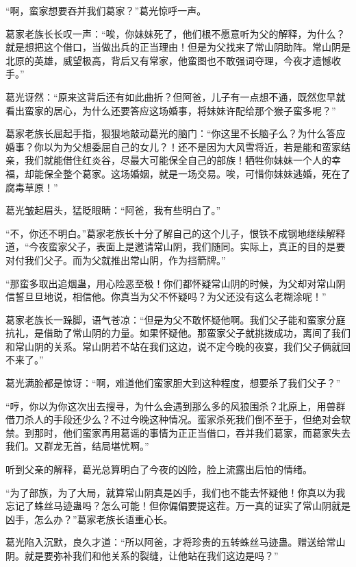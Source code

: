 
\begin{this_body}

“啊，蛮家想要吞并我们葛家？”葛光惊呼一声。

葛家老族长长叹一声：“唉，你妹妹死了，他们根不愿意听为父的解释，为什么？就是想把这个借口，当做出兵的正当理由！但是为父找来了常山阴助阵。常山阴是北原的英雄，威望极高，背后又有常家，他蛮图也不敢强词夺理，今夜才遗憾收手。”

葛光讶然：“原来这背后还有如此曲折？但阿爸，儿子有一点想不通，既然您早就看出蛮家的居心，为什么还要答应这场婚事，将妹妹许配给那个猴子蛮多呢？”

葛家老族长屈起手指，狠狠地敲动葛光的脑门：“你这里不长脑子么？为什么答应婚事？你以为为父想委屈自己的女儿？！还不是因为大风雪将近，若是能和蛮家结亲，我们就能借住红炎谷，尽最大可能保全自己的部族！牺牲你妹妹一个人的幸福，却能保全整个葛家。这场婚姻，就是一场交易。唉，可惜你妹妹逃婚，死在了腐毒草原！”

葛光皱起眉头，猛眨眼睛：“阿爸，我有些明白了。”

“不，你还不明白。”葛家老族长十分了解自己的这个儿子，恨铁不成钢地继续解释道，“今夜蛮家父子，表面上是邀请常山阴，我们随同。实际上，真正的目的是要对付我们父子。而为父就推出常山阴，作为挡箭牌。”

“那蛮多取出追烟蛊，用心险恶至极！你们都怀疑常山阴的时候，为父却对常山阴信誓旦旦地说，相信他。你真当为父不怀疑吗？为父还没有这么老糊涂呢！”

葛家老族长一跺脚，语气苍凉：“但是为父不敢怀疑他啊。我们父子能和蛮家分庭抗礼，是借助了常山阴的力量。如果怀疑他。那蛮家父子就挑拨成功，离间了我们和常山阴的关系。常山阴若不站在我们这边，说不定今晚的夜宴，我们父子俩就回不来了。”

葛光满脸都是惊讶：“啊，难道他们蛮家胆大到这种程度，想要杀了我们父子？”

“哼，你以为你这次出去搜寻，为什么会遇到那么多的风狼围杀？北原上，用兽群借刀杀人的手段还少么？不过今晚这种情况。蛮家杀死我们倒不至于，但绝对会软禁。到那时，他们蛮家再用葛谣的事情为正正当借口，吞并我们葛家，而葛家失去我们。又群龙无首，结局堪忧啊。”

听到父亲的解释，葛光总算明白了今夜的凶险，脸上流露出后怕的情绪。

“为了部族，为了大局，就算常山阴真是凶手，我们也不能去怀疑他！你真以为我忘记了蛛丝马迹蛊吗？怎么可能！但你偏偏要提这茬。万一真的证实了常山阴就是凶手，怎么办？”葛家老族长语重心长。

葛光陷入沉默，良久才道：“所以阿爸，才将珍贵的五转蛛丝马迹蛊。赠送给常山阴。就是要弥补我们和他关系的裂缝，让他站在我们这边是吗？”


\end{this_body}
